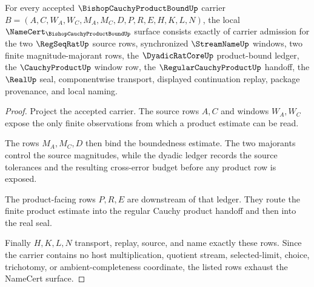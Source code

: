 \begin{theorem}
\label{thm:bishop-cauchy-product-bound-namecert-obligations}
For every accepted $\BishopCauchyProductBoundUp$ carrier $B=(A,C,W_A,W_C,M_A,M_C,D,P,R,E,H,K,L,N)$, the local $\NameCert_{\BishopCauchyProductBoundUp}$ surface consists exactly of carrier admission for the two $\RegSeqRatUp$ source rows, synchronized $\StreamNameUp$ windows, two finite magnitude-majorant rows, the $\DyadicRatCoreUp$ product-bound ledger, the $\CauchyProductUp$ window row, the $\RegularCauchyProductUp$ handoff, the $\RealUp$ seal, componentwise transport, displayed continuation replay, package provenance, and local naming.
\end{theorem}
\begin{proof}
Project the accepted carrier. The source rows $A,C$ and windows $W_A,W_C$ expose the only finite observations from which a product estimate can be read.

The rows $M_A,M_C,D$ then bind the boundedness estimate. The two majorants control the source magnitudes, while the dyadic ledger records the source tolerances and the resulting cross-error budget before any product row is exposed.

The product-facing rows $P,R,E$ are downstream of that ledger. They route the finite product estimate into the regular Cauchy product handoff and then into the real seal.

Finally $H,K,L,N$ transport, replay, source, and name exactly these rows. Since the carrier contains no host multiplication, quotient stream, selected-limit, choice, trichotomy, or ambient-completeness coordinate, the listed rows exhaust the NameCert surface.
\end{proof}

